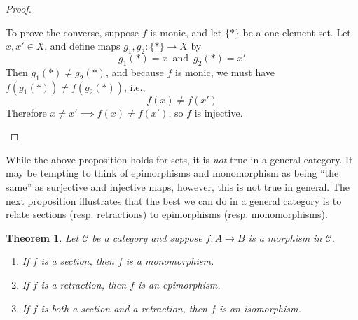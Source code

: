 \documentclass[10pt,oneside]{book}
\def\~#1{\mathscr{#1}}
\theoremstyle{plain}
\newtheorem{thm}{Theorem}[section]
\theoremstyle{definition}
\theoremstyle{remark}
\numberwithin{equation}{section}
\numberwithin{figure}{section}
\begin{document}
\begin{proof}
\begin{enumerate}[label=(\roman*)]
    To prove the converse, suppose $f$ is monic, and let $\{\ast\}$ be a one-element set. Let $x, x' \in X$, and define maps $g_1, g_2: \{\ast\} \to X$ by
    \[g_1(\ast) = x \,\text{ and }\, g_2(\ast) = x'\]
    Then $g_1(\ast) \neq g_2(\ast)$, and because $f$ is monic, we must have $f(g_1(\ast)) \neq f(g_2(\ast))$, i.e.,
    \[f(x) \neq f(x')\]
    Therefore $x \neq x' \implies f(x) \neq f(x')$, so $f$ is injective.
\end{enumerate}

\end{proof}
While the above proposition holds for sets, it is \emph{not} true in a general category. It may be tempting to think of epimorphisms and monomorphism as being ``the same'' as surjective and injective maps, however, this is not true in general. The next proposition illustrates that the best we can do in a general category is to relate sections (resp. retractions) to epimorphisms (resp. monomorphisms). 

\begin{thm}\label{prop:if_section_then_epi_etc}
    Let $\~C$ be a category and suppose $f: A \to B$ is a morphism in $\~C$. 
    \begin{enumerate}[label=(\roman*)]
        \item If $f$ is a section, then $f$ is a monomorphism. 
        \item If $f$ is a retraction, then $f$ is an epimorphism.
        \item If $f$ is both a section and a retraction, then $f$ is an isomorphism. 
    \end{enumerate}
\end{thm}
\end{document}
